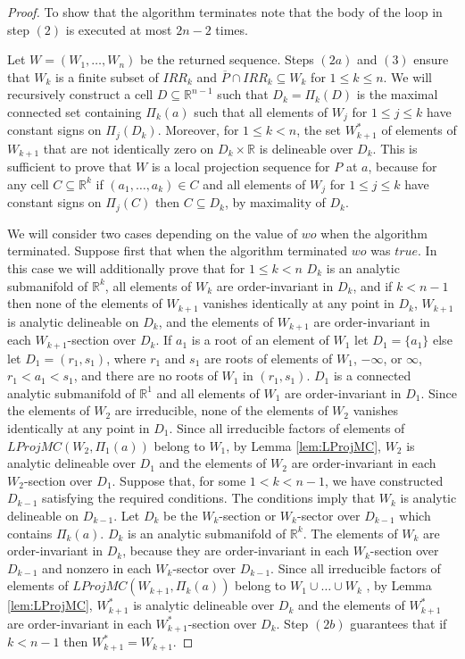 \documentclass[english]{amsart}
\numberwithin{equation}{section}
\numberwithin{figure}{section}
\begin{document}
\begin{proof}
To show that the algorithm terminates note that the body of the loop
in step $(2)$ is executed at most $2n-2$ times.

Let $W=(W_{1},\ldots,W_{n})$ be the returned sequence. Steps $(2a)$
and $(3)$ ensure that $W_{k}$ is a finite subset of $IRR_{k}$ and
$\overline{P}\cap IRR_{k}\subseteq W_{k}$ for $1\leq k\leq n$. We
will recursively construct a cell $D\subseteq\mathbb{R}^{n-1}$ such
that $D_{k}=\Pi_{k}(D)$ is the maximal connected set containing $\Pi_{k}(a)$
such that all elements of $W_{j}$ for $1\leq j\leq k$ have constant
signs on $\Pi_{j}(D_{k})$. Moreover, for $1\leq k<n$, the set $W_{k+1}^{*}$
of elements of $W_{k+1}$ that are not identically zero on $D_{k}\times\mathbb{R}$
is delineable over $D_{k}$. This is sufficient to prove that $W$
is a local projection sequence for $P$ at $a$, because for any cell
$C\subseteq\mathbb{R}^{k}$ if $(a_{1},\ldots,a_{k})\in C$ and all
elements of $W_{j}$ for $1\leq j\leq k$ have constant signs on $\Pi_{j}(C)$
then $C\subseteq D_{k}$, by maximality of $D_{k}$.

We will consider two cases depending on the value of $wo$ when the
algorithm terminated. Suppose first that when the algorithm terminated
$wo$ was $true$. In this case we will additionally prove that for
$1\leq k<n$ $D_{k}$ is an analytic submanifold of $\mathbb{R}^{k}$,
all elements of $W_{k}$ are order-invariant in $D_{k}$, and if $k<n-1$
then none of the elements of $W_{k+1}$ vanishes identically at any
point in $D_{k}$, $W_{k+1}$ is analytic delineable on $D_{k}$,
and the elements of $W_{k+1}$ are order-invariant in each $W_{k+1}$-section
over $D_{k}$. If $a_{1}$ is a root of an element of $W_{1}$ let
$D_{1}=\{a_{1}\}$ else let $D_{1}=(r_{1},s_{1})$, where $r_{1}$
and $s_{1}$ are roots of elements of $W_{1}$, $-\infty$, or $\infty$,
$r_{1}<a_{1}<s_{1}$, and there are no roots of $W_{1}$ in $(r_{1},s_{1})$.
$D_{1}$ is a connected analytic submanifold of $\mathbb{R}^{1}$
and all elements of $W_{1}$ are order-invariant in $D_{1}$. Since
the elements of $W_{2}$ are irreducible, none of the elements of
$W_{2}$ vanishes identically at any point in $D_{1}$. Since all
irreducible factors of elements of $LProjMC(W_{2},\Pi_{1}(a))$ belong
to $W_{1}$, by Lemma \ref{lem:LProjMC}, $W_{2}$ is analytic delineable
over $D_{1}$ and the elements of $W_{2}$ are order-invariant in
each $W_{2}$-section over $D_{1}$. Suppose that, for some $1<k<n-1$,
we have constructed $D_{k-1}$ satisfying the required conditions.
The conditions imply that $W_{k}$ is analytic delineable on $D_{k-1}$.
Let $D_{k}$ be the $W_{k}$-section or $W_{k}$-sector over $D_{k-1}$
which contains $\Pi_{k}(a)$. $D_{k}$ is an analytic submanifold
of $\mathbb{R}^{k}$. The elements of $W_{k}$ are order-invariant
in $D_{k}$, because they are order-invariant in each $W_{k}$-section
over $D_{k-1}$ and nonzero in each $W_{k}$-sector over $D_{k-1}$.
Since all irreducible factors of elements of $LProjMC(W_{k+1},\Pi_{k}(a))$
belong to $W_{1}\cup\ldots\cup W_{k}$ , by Lemma \ref{lem:LProjMC},
$W_{k+1}^{*}$ is analytic delineable over $D_{k}$ and the elements
of $W_{k+1}^{*}$ are order-invariant in each $W_{k+1}^{*}$-section
over $D_{k}$. Step $(2b)$ guarantees that if $k<n-1$ then $W_{k+1}^{*}=W_{k+1}$.


\end{proof}
\end{document}

